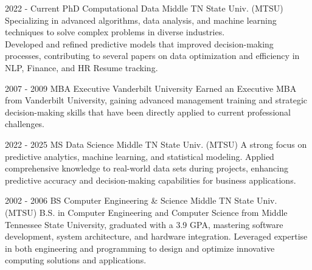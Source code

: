 \newpage
{}

\cvmetaevent
{2022 - Current}
{PhD Computational Data}
{Middle TN State Univ. (MTSU)}
{
Specializing in advanced algorithms, data analysis, and machine learning techniques to solve complex problems in diverse industries.\\

Developed and refined predictive models that improved decision-making processes, contributing to several papers on data optimization and efficiency in NLP, Finance, and HR Resume tracking.
}

\vfill\null
\cvmetaevent
{2007 - 2009}
{MBA Executive}
{Vanderbilt University}
{
Earned an Executive MBA from Vanderbilt University, gaining advanced management training and strategic decision-making skills that have been directly applied to current professional challenges.
}

\vfill\null
\cvmetaevent
{2022 - 2025}
{MS Data Science}
{Middle TN State Univ. (MTSU)}
{
A strong focus on predictive analytics, machine learning, and statistical modeling. Applied comprehensive knowledge to real-world data sets during projects, enhancing predictive accuracy and decision-making capabilities for business applications.
}

\vfill\null
\cvmetaevent
{2002 - 2006}
{BS Computer Engineering \& Science}
{Middle TN State Univ. (MTSU)}
{
B.S. in Computer Engineering and Computer Science from Middle Tennessee State University, graduated with a 3.9 GPA, mastering software development, system architecture, and hardware integration. Leveraged expertise in both engineering and programming to design and optimize innovative computing solutions and applications.
}
